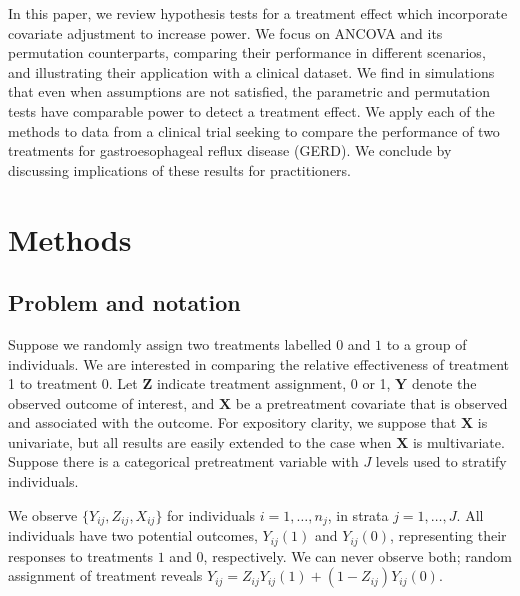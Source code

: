\documentclass[11pt]{article}
\newcommand{\todo}[1]{{\color{red}{TO DO: \sc #1}}}
\begin{document}
In this paper, we review hypothesis tests for a treatment effect which incorporate covariate adjustment to increase power.  
We focus on ANCOVA and its permutation counterparts, comparing their performance in different scenarios, and illustrating their application with a clinical dataset.
We find in simulations that even when assumptions are not satisfied, the parametric and permutation tests have comparable power to detect a treatment effect.
We apply each of the methods to data from a clinical trial seeking to compare the performance of two treatments for gastroesophageal reflux disease (GERD).
We conclude by discussing implications of these results for practitioners.

\section{Methods}


\subsection{Problem and notation \todo{what do others call this?}}
Suppose we randomly assign two treatments labelled $0$ and $1$ to a group of individuals.
We are interested in comparing the relative effectiveness of treatment 1 to treatment 0.
Let $\mathbf{Z}$ indicate treatment assignment, 0 or 1, 
$\mathbf{Y}$ denote the observed outcome of interest,
and $\mathbf{X}$ be a pretreatment covariate that is observed and associated with the outcome.
For expository clarity, we suppose that $\mathbf{X}$ is univariate, but all results are easily extended to the case when $\mathbf{X}$ is multivariate.
Suppose there is a categorical pretreatment variable with $J$ levels used to stratify individuals. 

We observe $\{Y_{ij}, Z_{ij}, X_{ij}\}$ for individuals $i = 1, \dots, n_j$, in strata $j = 1, \dots, J$.
All individuals have two potential outcomes, $Y_{ij}(1)$ and $Y_{ij}(0)$, representing their responses to treatments $1$ and $0$, respectively.
We can never observe both; random assignment of treatment reveals $Y_{ij} = Z_{ij}Y_{ij}(1) + (1-Z_{ij})Y_{ij}(0)$.
\end{document}
